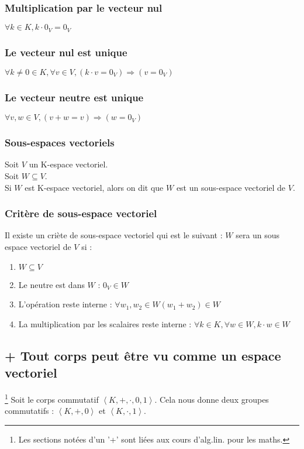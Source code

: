 \documentclass[a4paper,10pt]{article}
\newcommand{\grp}[1]{\left\langle #1 \right\rangle} %
\begin{document}
  \subsubsection{Multiplication par le vecteur nul}
   $\forall k \in K, k \cdot 0_V = 0_V$

  \subsubsection{Le vecteur nul est unique}
   $\forall k \neq 0 \in K, \forall v \in V, (k \cdot v = 0_V) \Rightarrow (v = 0_V)$

  \subsubsection{Le vecteur neutre est unique}
   $\forall v, w \in V, (v+w = v) \Rightarrow (w = 0_V)$

  \subsubsection{Sous-espaces vectoriels}
   Soit $V$ un K-espace vectoriel.\\
   Soit $W \subseteq V$.\\
   Si $W$ est K-espace vectoriel, alors on dit que $W$ est un sous-espace vectoriel de $V$.

  \subsubsection{Critère de sous-espace vectoriel}
   Il existe un criète de sous-espace vectoriel qui est le suivant :
   $W$ sera un sous espace vectoriel de $V$ si :
   \begin{enumerate}
    \item $W \subseteq V$
    \item Le neutre est dans $W$ : $0_V \in W$
    \item L'opération reste interne : $\forall w_1,w_2 \in W (w_1+w_2) \in W$
    \item La multiplication par les scalaires reste interne : $\forall k \in K, \forall w \in W, k \cdot w \in W$
   \end{enumerate}

  \subsection{+ Tout corps peut être vu comme un espace vectoriel}\footnote{Les sections notées d'un '+' sont liées aux cours d'alg.lin. pour les maths.}
   Soit le corps commutatif $\grp{K, +, \cdot, 0, 1}$. Cela nous donne deux groupes commutatifs : $\grp{K, +, 0}$ et $\grp{K, \cdot, 1}$.
\end{document}
